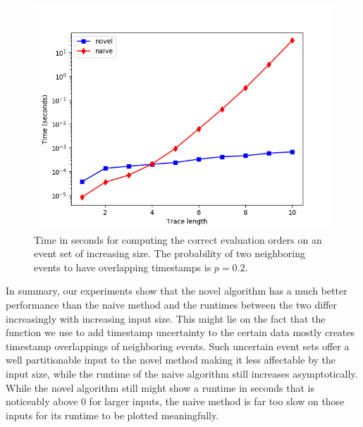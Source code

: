 \begin{figure}
	\centering
	\includegraphics[width=0.8\columnwidth]{figures/fixed_p_02_logscale.png}
	\caption{Time in seconds for computing the correct evaluation orders on an event set of increasing size. The probability of two neighboring events to have overlapping timestamps is $p=0.2$.}
	\label{fig: series22}
\end{figure}
%
%
%
%
%
%
%
%
In summary, our experiments show that the novel algorithm has a much better performance than the naive method and the runtimes between the two differ increasingly with increasing input size.
This might lie on the fact that the function we use to add timestamp uncertainty to the certain data mostly creates timestamp overlappings of neighboring events.
Such uncertain event sets offer a well partitionable input to the novel method making it less affectable by the input size, while the runtime of the naive algorithm still increases asymptotically.
While the novel algorithm still might show a runtime in seconds that is noticeably above 0 for larger inputs, the naive method is far too slow on those inputs for its runtime to be plotted meaningfully.
%
%
%
%
%
